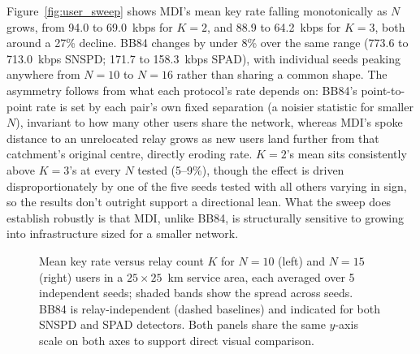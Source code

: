 \documentclass[12pt]{article}
\begin{document}
Figure~\ref{fig:user_sweep} shows MDI's mean key rate falling monotonically as $N$ grows, from 94.0 to 69.0~kbps for $K=2$, and 88.9 to 64.2~kbps for $K=3$, both around a 27\% decline. BB84 changes by under 8\% over the same range (773.6 to 713.0~kbps SNSPD; 171.7 to 158.3~kbps SPAD), with individual seeds peaking anywhere from $N=10$ to $N=16$ rather than sharing a common shape. The asymmetry follows from what each protocol's rate depends on: BB84's point-to-point rate is set by each pair's own fixed separation (a noisier statistic for smaller $N$), invariant to how many other users share the network, whereas MDI's spoke distance to an unrelocated relay grows as new users land further from that catchment's original centre, directly eroding rate. $K=2$'s mean sits consistently above $K=3$'s at every $N$ tested (5--9\%), though the effect is driven disproportionately by one of the five seeds tested with all others varying in sign, so the results don't outright support a directional lean. What the sweep does establish robustly is that MDI, unlike BB84, is structurally sensitive to growing into infrastructure sized for a smaller network.

\begin{figure}[htbp]
    \centering
    \begin{subfigure}[t]{235pt}
        \centering
        
        \label{fig:relay_sweep_n10}
    \end{subfigure}%
    \begin{subfigure}[t]{235pt}
        \centering
        
        \label{fig:relay_sweep_n15}
    \end{subfigure}
    \caption{Mean key rate versus relay count $K$ for $N=10$ (left) and $N=15$ (right) users in a $25\times25$~km service area, each averaged over 5 independent seeds; shaded bands show the spread across seeds. BB84 is relay-independent (dashed baselines) and indicated for both SNSPD and SPAD detectors. Both panels share the same $y$-axis scale on both axes to support direct visual comparison.}
    \label{fig:relay_sweep}
\end{figure}
\end{document}
